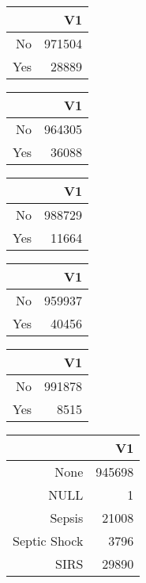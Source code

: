 \bigskip\bigskip
\centering
\begin{tabular}{rr}
  \hline
 & V1 \\ 
  \hline
No & 971504 \\ 
  Yes & 28889 \\ 
   \hline
\end{tabular}

\bigskip\bigskip
\centering
\begin{tabular}{rr}
  \hline
 & V1 \\ 
  \hline
No & 964305 \\ 
  Yes & 36088 \\ 
   \hline
\end{tabular}

\bigskip\bigskip
\centering
\begin{tabular}{rr}
  \hline
 & V1 \\ 
  \hline
No & 988729 \\ 
  Yes & 11664 \\ 
   \hline
\end{tabular}

\bigskip\bigskip
\centering
\begin{tabular}{rr}
  \hline
 & V1 \\ 
  \hline
No & 959937 \\ 
  Yes & 40456 \\ 
   \hline
\end{tabular}

\bigskip\bigskip
\centering
\begin{tabular}{rr}
  \hline
 & V1 \\ 
  \hline
No & 991878 \\ 
  Yes & 8515 \\ 
   \hline
\end{tabular}

\bigskip\bigskip
\centering
\begin{tabular}{rr}
  \hline
 & V1 \\ 
  \hline
None & 945698 \\ 
  NULL &   1 \\ 
  Sepsis & 21008 \\ 
  Septic Shock & 3796 \\ 
  SIRS & 29890 \\ 
   \hline
\end{tabular}

